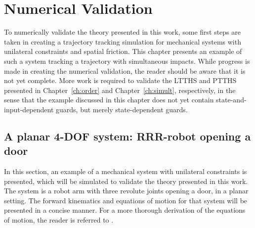 \documentclass[../DC2017114Bouma.tex]{subfiles}
\begin{document}
\graphicspath{{04_Validation/img/}}
\renewcommand{\chaptermark}[1]{\markboth{\thechapter.\ #1}{}}
\renewcommand{\sectionmark}[1]{\markright{#1}{}}
\pagestyle{fancyreport}
\cleartooddpage
\pagestyle{fancyreport}
\chapter{Numerical Validation}\label{ch:vali}
To numerically validate the theory presented in this work, some first steps are taken in creating a trajectory tracking simulation for mechanical systems with unilateral constraints and spatial friction. This chapter presents an example of such a system tracking a trajectory with simultaneous impacts. While progress is made in creating the numerical validation, the reader should be aware that it is not yet complete. More work is required to validate the LTTHS and PTTHS presented in Chapter~\ref{ch:order} and Chapter~\ref{ch:simult}, respectively, in the sense that the example discussed in this chapter does not yet contain state-and-input-dependent guards, but merely state-dependent guards.

\section{A planar 4-DOF system: RRR-robot opening a door}
In this section, an example of a mechanical system with unilateral constraints is presented, which will be simulated to validate the theory presented in this work. The system is a robot arm with three revolute joints opening a door, in a planar setting. The forward kinematics and equations of motion for that system will be presented in a concise manner. For a more thorough derivation of the equations of motion, the reader is referred to \cite{Rijnen2018b}. 
\end{document}

